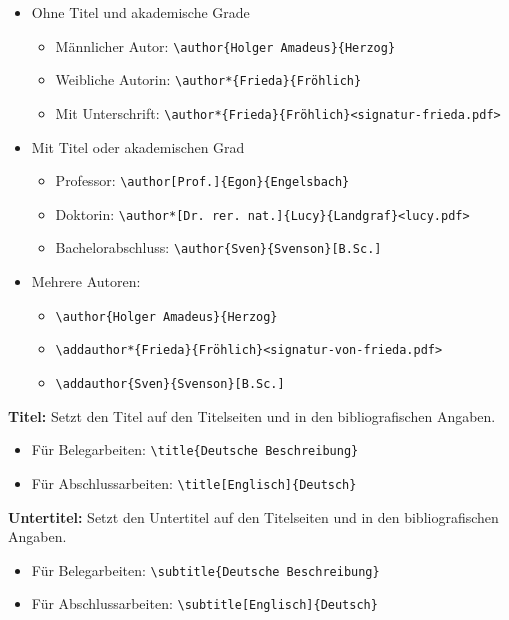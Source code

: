 	\begin{itemize}
		\item Ohne Titel und akademische Grade
		\begin{itemize}
			\item Männlicher Autor: \verb|\author{Holger Amadeus}{Herzog}|
			\item Weibliche Autorin: \verb|\author*{Frieda}{Fröhlich}|
			\item Mit Unterschrift: \verb|\author*{Frieda}{Fröhlich}<signatur-frieda.pdf>|
		\end{itemize}
		\item Mit Titel oder akademischen Grad
		\begin{itemize}
			\item Professor: \verb|\author[Prof.]{Egon}{Engelsbach}|
			\item Doktorin: \verb|\author*[Dr. rer. nat.]{Lucy}{Landgraf}<lucy.pdf>|
			\item Bachelorabschluss: \verb|\author{Sven}{Svenson}[B.Sc.]|
		\end{itemize}
		\item Mehrere Autoren:
		\begin{itemize}
			\item \verb|\author{Holger Amadeus}{Herzog}|
			\item \verb|\addauthor*{Frieda}{Fröhlich}<signatur-von-frieda.pdf>|
			\item \verb|\addauthor{Sven}{Svenson}[B.Sc.]|
		\end{itemize}
	\end{itemize}
	
	\textbf{Titel:}\label{cmd:title}
	Setzt den Titel auf den Titelseiten und in den bibliografischen Angaben.
	\begin{itemize}
		\item Für Belegarbeiten: \verb|\title{Deutsche Beschreibung}|
		\item Für Abschlussarbeiten: \verb|\title[Englisch]{Deutsch}|
	\end{itemize}
	
	\textbf{Untertitel:}\label{cmd:subtitle}
	Setzt den Untertitel auf den Titelseiten und in den bibliografischen Angaben.
	\begin{itemize}
		\item Für Belegarbeiten: \verb|\subtitle{Deutsche Beschreibung}|
		\item Für Abschlussarbeiten: \verb|\subtitle[Englisch]{Deutsch}|
	\end{itemize}
	
